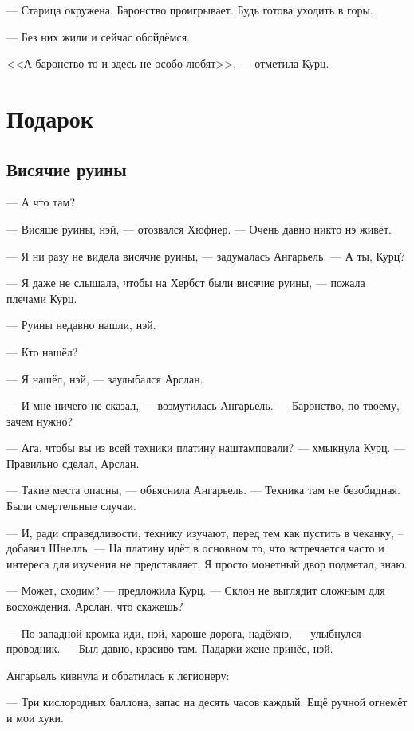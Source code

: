 --- Старица окружена.
Баронство проигрывает.
Будь готова уходить в горы.

--- Без них жили и сейчас обойдёмся.

<<А баронство-то и здесь не особо любят>>, --- отметила Курц.


\chapter{Подарок}

\section{Висячие руины}

--- А что там?

--- Висяше руины, нэй, --- отозвался Хюфнер.
--- Очень давно никто нэ живёт.

--- Я ни разу не видела висячие руины, --- задумалась Ангарьель.
--- А ты, Курц?

--- Я даже не слышала, чтобы на Хербст были висячие руины, --- пожала плечами Курц.

--- Руины недавно нашли, нэй.

--- Кто нашёл?

--- Я нашёл, нэй, --- заулыбался Арслан.

--- И мне ничего не сказал, --- возмутилась Ангарьель.
--- Баронство, по-твоему, зачем нужно?

--- Ага, чтобы вы из всей техники платину наштамповали? --- хмыкнула Курц.
--- Правильно сделал, Арслан.

--- Такие места опасны, --- объяснила Ангарьель.
--- Техника там не безобидная.
Были смертельные случаи.

--- И, ради справедливости, технику изучают, перед тем как пустить в чеканку, -- добавил Шнелль.
--- На платину идёт в основном то, что встречается часто и интереса для изучения не представляет.
Я просто монетный двор подметал, знаю.

--- Может, сходим? --- предложила Курц.
--- Склон не выглядит сложным для восхождения.
Арслан, что скажешь?

--- По западной кромка иди, нэй, хароше дорога, надёжнэ, --- улыбнулся проводник.
--- Был давно, красиво там.
Падарки жене принёс, нэй.

Ангарьель кивнула и обратилась к легионеру:

--- Три кислородных баллона, запас на десять часов каждый.
Ещё ручной огнемёт и мои хуки.

